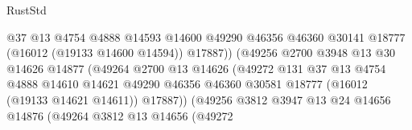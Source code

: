 \begin{lexlean}{RustStd}
\begin{coremodule}
                                            @37
                                            @13
                                            @4754
                                            @4888
                                            @14593
                                            @14600
                                            @49290
                                            @46356
                                            @46360
                                            @30141
                                            @18777
                                            (@16012 (@19133 @14600 @14594))
                                            @17887))
                                        (@49256
                                          @2700
                                          @3948
                                          @13
                                          @30
                                          @14626
                                          @14877
                                          (@49264
                                            @2700
                                            @13
                                            @14626
                                            (@49272
                                              @131
                                              @37
                                              @13
                                              @4754
                                              @4888
                                              @14610
                                              @14621
                                              @49290
                                              @46356
                                              @46360
                                              @30581
                                              @18777
                                              (@16012 (@19133 @14621 @14611))
                                              @17887))
                                          (@49256
                                            @3812
                                            @3947
                                            @13
                                            @24
                                            @14656
                                            @14876
                                            (@49264
                                              @3812
                                              @13
                                              @14656
                                              (@49272

\end{coremodule}
\end{lexlean}
